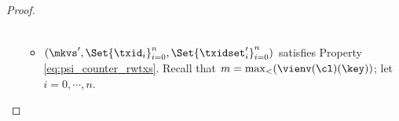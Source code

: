 \begin{proof}
\begin{itemize}
\begin{itemize}
\[\begin{array}{ll}
\end{array}
\]
%

\item $(\mkvs',  \Set{\txid_{i}}_{i=0}^{n}, \Set{\txidset'_{i}}_{i=0}^{n})$ satisfies Property \eqref{eq:psi_counter_rwtxs}. 
Recall that $m = \max_{<}(\vienv(\cl)(\key))$; let $i=0,\cdots,n$.


\end{itemize}
\end{itemize}
\end{proof}
